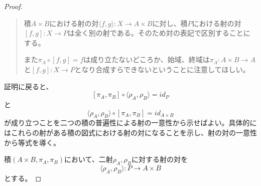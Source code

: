 \documentclass[uplatex,dvipdfmx]{jsarticle}
\newcommand{\arrow}{\rightarrow}
\newcommand{\tuple}[1]{\langle #1\rangle}
\newcommand{\mor}[3]{#1:#2\arrow #3}
\newtheorem{proof}{証明}[section]
\numberwithin{proof}{subsection}
\begin{document}
\begin{proof}
\begin{quote}
			積$A\times B$における射の対$\mor{\tuple{f,g}}{X}{A\times B}$に対し、積$P$における射の対$\mor{[f,g]}{X}{P}$は全く別の射である。そのため対の表記で区別することにする。

			また$\pi_A\circ[f,g]=f$は成り立たないどころか、始域、終域は$\mor{\pi_A}{A\times B}{A}$と$\mor{[f,g]}{X}{P}$となり合成すらできないということに注意してほしい。
		\end{quote}
		証明に戻ると、\[[\pi_A,\pi_B]\circ\tuple{\rho_A,\rho_B}=id_P\]と
		\[\tuple{\rho_A,\rho_B}\circ[\pi_A,\pi_B]=id_{A\times B}\]が成り立つことを二つの積の普遍性による射の一意性から示せばよい。具体的にはこれらの射がある積の図式における射の対になることを示し、射の対の一意性から等式を導く。

		積$(A\times B,\pi_A,\pi_B)$において、二射$\rho_A,\rho_B$に対する射の対を\[\mor{\tuple{\rho_A,\rho_B}}{P}{A\times B}\]とする。


\end{proof}
\end{document}
